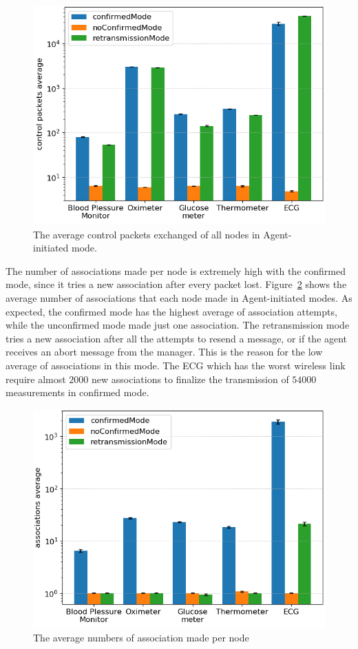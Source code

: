 \begin{figure}[htbp]
\centerline{\includegraphics[width=\linewidth]{figures/ControlPacketsPerNode.png}}
\caption{The average control packets exchanged of all nodes in Agent-initiated mode.}
\label{fig:controlpacketsexchanged}
\end{figure}

The number of associations made per node is extremely high with the confirmed mode, since it tries a new association after every packet lost. Figure~\ref{fig:associationnumber} shows the average number of associations that each node made in Agent-initiated modes. As expected, the confirmed mode has the highest average of association attempts, while the unconfirmed mode made just one association. The retransmission mode tries a new association after all the attempts to resend a message, or if the agent receives an abort message from the manager. This is the reason for the low average of associations in this mode. The ECG which has the worst wireless link require almost $2000$ new associations to finalize the transmission of $54000$ measurements in confirmed mode.

\begin{figure}[htbp]
\centerline{\includegraphics[width=\linewidth]{figures/AssociationsMadePerNode.png}}
\caption{The average numbers of association made per node}
\label{fig:associationnumber}
\end{figure}

